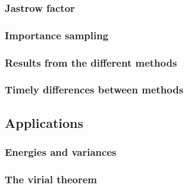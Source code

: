 \subsubsection{Jastrow factor}

\subsubsection{Importance sampling}

\subsubsection{Results from the different methods}

\subsubsection{Timely differences between methods}






\subsection{Applications}

\subsubsection{Energies and variances}

\subsubsection{The virial theorem }